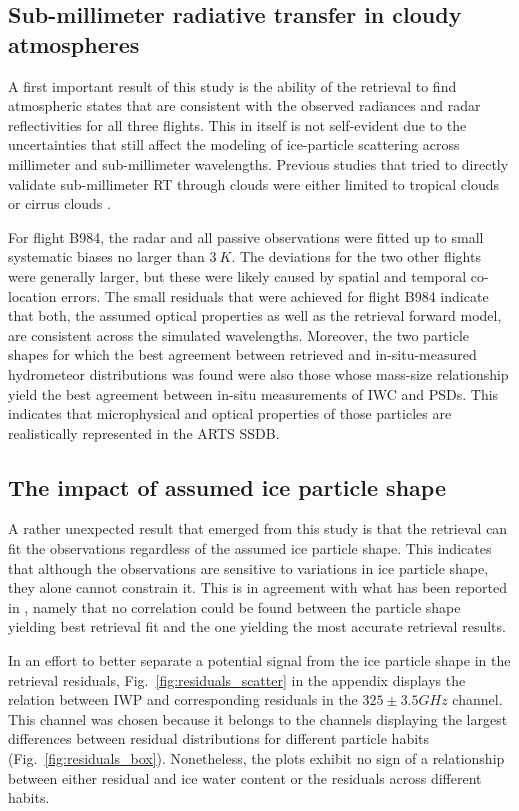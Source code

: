 \documentclass[journal abbreviation, manuscript]{copernicus}
\begin{document}
\subsection{Sub-millimeter radiative transfer in cloudy atmospheres}

 A first important result of this study is the ability of the retrieval to find
 atmospheric states that are consistent with the observed radiances and radar
 reflectivities for all three flights. This in itself is not self-evident due to
 the uncertainties that still affect the modeling of ice-particle scattering
 across millimeter and sub-millimeter wavelengths. Previous studies that tried
 to directly validate sub-millimeter RT through clouds were either limited to
 tropical clouds \citep{evans05, eriksson07} or cirrus clouds \citep{fox17}.

 For flight B984, the radar and all passive observations were fitted up to small
 systematic biases no larger than $3\ \unit{K}$. The deviations for the two
 other flights were generally larger, but these were likely caused by spatial
 and temporal co-location errors. The small residuals that were achieved for
 flight B984 indicate that both, the assumed optical properties as well as the
 retrieval forward model, are consistent across the simulated wavelengths.
 Moreover, the two particle shapes for which the best agreement between
 retrieved and in-situ-measured hydrometeor distributions was found were also
 those whose mass-size relationship yield the best agreement between in-situ
 measurements of IWC and PSDs. This indicates that microphysical and optical
 properties of those particles are realistically represented in the ARTS SSDB.

\subsection{The impact of assumed ice particle shape}

A rather unexpected result that emerged from this study is that the retrieval
can fit the observations regardless of the assumed ice particle shape. This
indicates that although the observations are sensitive to variations in ice
particle shape, they alone cannot constrain it. This is in agreement with what
has been reported in \citet{pfreundschuh20}, namely that no correlation could be
found between the particle shape yielding best retrieval fit and the one
yielding the most accurate retrieval results.

In an effort to better separate a potential signal from the ice particle shape
in the retrieval residuals, Fig.~\ref{fig:residuals_scatter} in the appendix
displays the relation between IWP and corresponding residuals in the $325 \pm
3.5 \unit{GHz}$ channel. This channel was chosen because it belongs to the
channels displaying the largest differences between residual distributions for
different particle habits (Fig.~\ref{fig:residuals_box}). Nonetheless, the
plots exhibit no sign of a relationship between either residual and ice
water content or the residuals across different habits.
\end{document}
